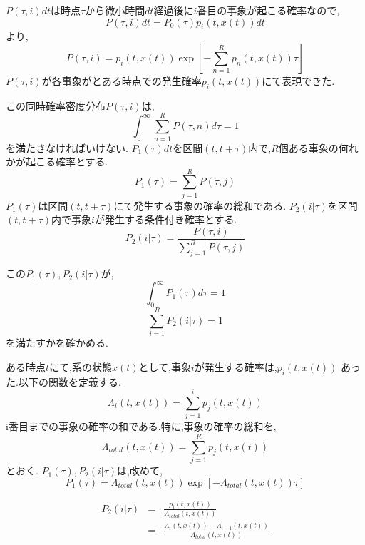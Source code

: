 \documentclass[12pt]{jsreport}
\begin{document}
$P(\tau, i)dt$は時点$\tau$から微小時間$dt$経過後に$i$番目の事象が起こる確率なので,
\begin{equation}
 P(\tau, i)dt =  P_0(\tau)p_i(t,x(t))dt
\end{equation}
より,
\begin{equation}
 P(\tau, i) = p_i(t,x(t))\exp\left[-\sum_{n=1}^{R} p_n(t,x(t))\tau\right]
\end{equation}
$P(\tau, i)$が各事象がとある時点での発生確率$p_i(t,x(t))$にて表現できた.

この同時確率密度分布$P(\tau, i)$は,
\begin{equation}
\int^{\infty}_0 \sum^{R}_{n=1} P(\tau,n)d\tau = 1 \label{int_P_t_i}
\end{equation}
を満たさなければいけない.
$P_1(\tau)dt$を区間$(t,t+\tau)$内で,$R$個ある事象の何れかが起こる確率とする.
\begin{equation}
 P_1(\tau) = \sum^{R}_{j=1} P(\tau,j)
\end{equation}
$P_1(\tau)$は区間$(t,t+\tau)$にて発生する事象の確率の総和である.
$P_2(i|\tau)$を区間$(t,t+\tau)$内で事象$i$が発生する条件付き確率とする.
\begin{equation}
 P_2(i|\tau) = \frac{P(\tau, i)}{\sum^{R}_{j=1} P(\tau,j)}
\end{equation}

この$P_1(\tau),P_2(i|\tau)$が,
\begin{equation}
\int^{\infty}_0 P_1(\tau)d\tau = 1 \label{int_P_1}
\end{equation}
\begin{equation}
\sum^{R}_{i=1} P_2(i|\tau) = 1 \label{sum_P_2}
\end{equation}
を満たすかを確かめる.

ある時点$t$にて,系の状態$x(t)$として,事象$i$が発生する確率は,$p_i(t,x(t))$
あった.以下の関数を定義する.
\begin{equation}
\Lambda_i(t,x(t)) = \sum^{i}_{j=1} p_j(t,x(t)) \label{L1}
\end{equation}
i番目までの事象の確率の和である.特に,事象の確率の総和を,
\begin{equation}
\Lambda_{total}(t,x(t)) = \sum^{R}_{j=1} p_j(t,x(t))
\end{equation}
とおく.
$P_1(\tau),P_2(i|\tau)$は,改めて,
\begin{equation}
P_1(\tau) = \Lambda_{total}(t,x(t)) \exp\left[ - \Lambda_{total}(t,x(t))\tau \right] \label{P_1}
\end{equation}

\begin{eqnarray}
P_2(i|\tau) & = & \frac{p_i(t,x(t))}{\Lambda_{total}(t,x(t))} \label{P_2} \\
            & = & \frac{\Lambda_i(t,x(t))-\Lambda_{i-1}(t,x(t))}{\Lambda_{total}(t,x(t))} \label{P_2_2}
\end{eqnarray}
\end{document}
